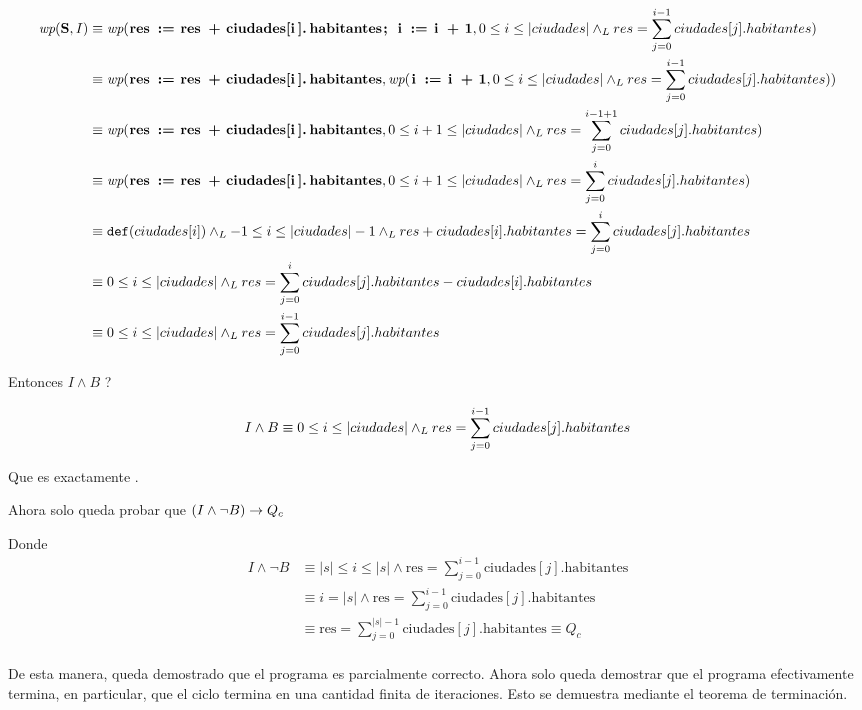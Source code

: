 \documentclass[10pt,a4paper]{article}
\begin{document}
\begin{align*}
	\wp{S}{I} & \equiv  \wp{ res := res + ciudades[i].habitantes; i := i + 1}{0 \leq i \leq |ciudades| \yLuego res = \sum_{j=0}^{i-1} ciudades[j].habitantes}      \\
	          & \equiv  \wp{ res := res + ciudades[i].habitantes}{\wp{i := i + 1}{0 \leq i \leq |ciudades| \yLuego res = \sum_{j=0}^{i-1} ciudades[j].habitantes}} \\
	          & \equiv  \wp{ res := res + ciudades[i].habitantes}{0 \leq i+1 \leq |ciudades| \yLuego res = \sum_{j=0}^{i-1 + 1} ciudades[j].habitantes}            \\
	          & \equiv  \wp{ res := res + ciudades[i].habitantes}{0 \leq i+1 \leq |ciudades| \yLuego res = \sum_{j=0}^{i} ciudades[j].habitantes}                  \\
	          & \equiv  \Def{ciudades[i]} \yLuego -1 \leq i \leq |ciudades| -1 \yLuego res + ciudades[i].habitantes = \sum_{j=0}^{i} ciudades[j].habitantes        \\
	          & \equiv  0 \leq i \leq |ciudades| \yLuego res = \sum_{j=0}^{i} ciudades[j].habitantes - ciudades[i].habitantes                                      \\
	          & \equiv  0 \leq i \leq |ciudades|  \yLuego res = \sum_{j=0}^{i-1} ciudades[j].habitantes
\end{align*}


Entonces $\ensuremath{I \land B}$  \implica {}?

\[{I \land B}  \equiv  0 \leq i \leq |ciudades|  \land _L res = \sum_{j=0}^{i-1} ciudades[j].habitantes \]

Que es exactamente .
\bigskip

Ahora solo queda probar que  $(I \land \neg B) \rightarrow Q_c$

Donde
\begin{align*}
	I \land \neg B & \equiv |s| \leq i \leq |s| \land \text{res} = \sum_{j=0}^{i-1} \text{ciudades}[j].\text{habitantes} \\
	               & \equiv i = |s| \land \text{res} = \sum_{j=0}^{i-1} \text{ciudades}[j].\text{habitantes}             \\
	               & \equiv \text{res} = \sum_{j=0}^{|s|-1} \text{ciudades}[j].\text{habitantes} \equiv Q_c              \\
\end{align*}

De esta manera, queda demostrado que el programa es parcialmente correcto. Ahora solo queda demostrar que el programa efectivamente termina, en particular, que el ciclo termina en una cantidad finita de iteraciones. Esto se demuestra mediante el teorema de terminación.
\bigskip
\end{document}
